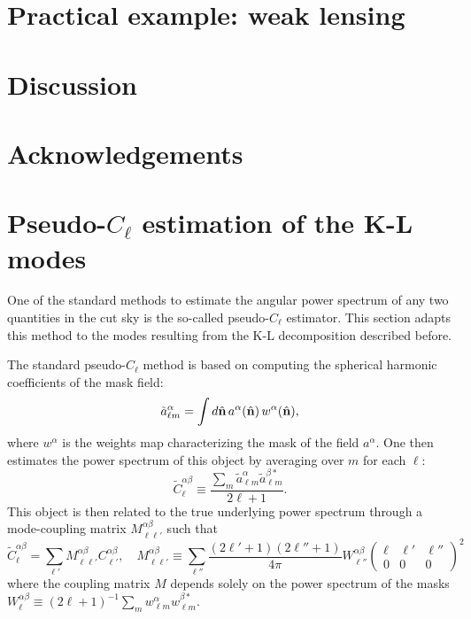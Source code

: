 \documentclass[twocolumn,amsfont,amssymb,amsmath, showpacs,balancelastpage, nofootinbib]{revtex4-1}
\newcommand{\nv}{\hat{\bf n}}
\begin{document}
    
\section{Practical example: weak lensing}
  \lipsum[2]

\section{Discussion}\label{sec:discussion}
  \lipsum[3]

\section*{Acknowledgements}
  \lipsum[4]
  


\appendix
\onecolumngrid
\section{Pseudo-$C_\ell$ estimation of the K-L modes}\label{app:pcl}
  One of the standard methods to estimate the angular power spectrum of any two quantities in the cut sky is the so-called pseudo-$C_\ell$ estimator. This section adapts this method to the modes resulting from the K-L decomposition described before.
  
  The standard pseudo-$C_\ell$ method is based on computing the spherical harmonic coefficients of the mask field:
  \begin{equation}
    \tilde{a}^\alpha_{\ell m}=\int d\nv\,a^\alpha(\nv)\,w^\alpha(\nv),
  \end{equation}
  where $w^\alpha$ is the weights map characterizing the mask of the field $a^\alpha$. One then estimates the power spectrum of this object by averaging over $m$ for each $\ell$:
  \begin{equation}
    \tilde{C}^{\alpha\beta}_\ell\equiv\frac{\sum_m\tilde{a}^\alpha_{\ell m}\tilde{a}^{\beta *}_{\ell m}}{2\ell+1}.
  \end{equation}
  This object is then related to the true underlying power spectrum through a mode-coupling matrix $M^{\alpha\beta}_{\ell\ell'}$ such that
  \begin{equation}
    \tilde{C}^{\alpha\beta}_\ell=\sum_{\ell'}M^{\alpha\beta}_{\ell\ell'}C^{\alpha\beta}_{\ell'},\hspace{12pt}
    M^{\alpha\beta}_{\ell \ell'}\equiv\sum_{\ell''}\frac{(2\ell'+1)(2\ell''+1)}{4\pi}W^{\alpha\beta}_{\ell''}
    \left(
    \begin{array}{ccc}
      \ell & \ell' & \ell''\\
      0 & 0 & 0
    \end{array}
    \right)^2
  \end{equation}
  where the coupling matrix $M$ depends solely on the power spectrum of the masks $W^{\alpha\beta}_\ell\equiv(2\ell+1)^{-1}\sum_mw^\alpha_{\ell m}w^{\beta *}_{\ell m}$.
  
\end{document}
